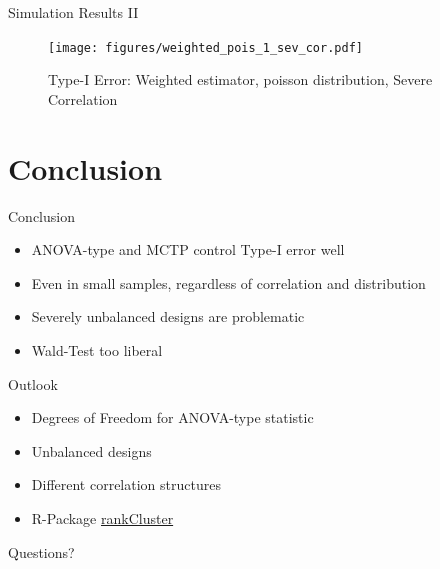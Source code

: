 \documentclass[xcolor=dvipsnames, aspectratio = 169]{beamer}
\begin{document}
\begin{frame}{Simulation Results II}
\begin{figure}
	\texttt{[image: figures/weighted\_pois\_1\_sev\_cor.pdf]}
	\caption{Type-I Error: Weighted estimator, poisson distribution, Severe Correlation}
\end{figure}
\end{frame}

\section{Conclusion}
\begin{frame}{Conclusion}
\begin{itemize}
	\item ANOVA-type and MCTP control Type-I error well
	\item Even in small samples, regardless of correlation and distribution
	\item Severely unbalanced designs are problematic
	\item Wald-Test too liberal
\end{itemize}
\end{frame}

\begin{frame}{Outlook}
\begin{itemize}
	\item Degrees of Freedom for ANOVA-type statistic
	\item Unbalanced designs
	\item Different correlation structures
	\item R-Package \href{https://github.com/spruenke/rankCluster}{rankCluster}
\end{itemize}
\end{frame}

\begin{frame}{}
	\begin{center}
		 {\Huge Questions?}	
	\end{center}

\end{frame}
\end{document}
